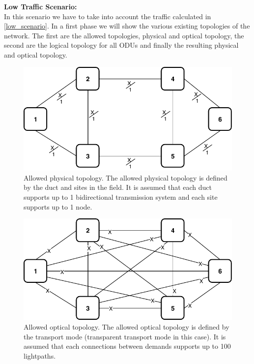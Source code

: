\newpage
\textbf{Low Traffic Scenario:}\\

In this scenario we have to take into account the traffic calculated in \ref{low_scenario}. In a first phase we will show the various existing topologies of the network. The first are the allowed topologies, physical and optical topology, the second are the logical topology for all ODUs and finally the resulting physical and optical topology.\\

\begin{figure}[h!]
\centering
\includegraphics[width=12cm]{sdf/ilp/transparent_survivability/figures/allowed_physical_topology}
\caption{Allowed physical topology. The allowed physical topology is defined by the duct and sites in the field. It is assumed that each duct supports up to 1 bidirectional transmission system and each site supports up to 1 node.}
\label{allowed2_physical_low}
\end{figure}

\vspace{11pt}
\begin{figure}[h!]
\centering
\includegraphics[width=12cm]{sdf/ilp/transparent_survivability/figures/allowed_optical_topology}
\caption{Allowed optical topology. The allowed optical topology is defined by the transport mode (transparent transport mode in this case). It is assumed that each connections between demands supports up to 100 lightpaths.}
\label{allowed2_optical_low}
\end{figure}


